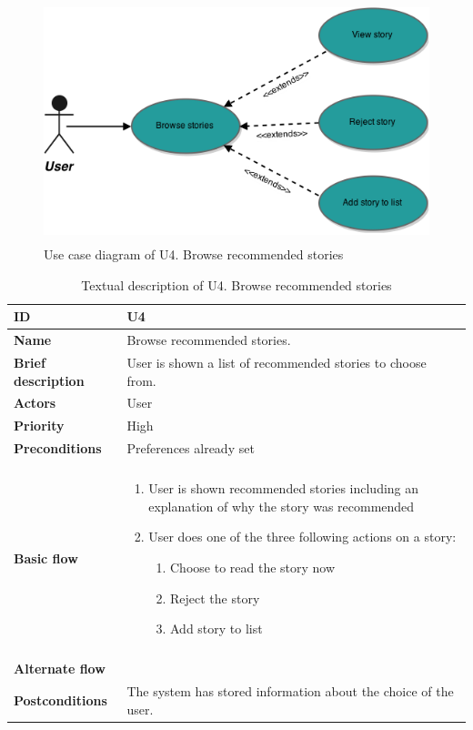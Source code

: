 \begin{figure}[hp]
	\includegraphics[height=7cm]{fig/U4}
	\centering
	\caption{Use case diagram of U4. Browse recommended stories}
	\label{Fig:U4}
\end{figure}

\begin{table}[hp]
	\renewcommand{\arraystretch}{1.5}
	\centering
	\caption{Textual description of U4. Browse recommended stories}
	\begin{tabular}[b]{|l | l|}\hline
		\textbf{ID} 				& U4									\\\hline
		\textbf{Name} 				& Browse recommended stories.			\\\hline
		\textbf{Brief description}	& User is shown a list of recommended stories to choose from. 		\\\hline
		\textbf{Actors} 			& User									\\\hline
		\textbf{Priority}			& High									\\\hline
		\textbf{Preconditions}		& Preferences already set				\\\hline&\\[-2ex]
		\textbf{Basic flow}			& \begin{minipage}{5in}
			\begin{enumerate}[noitemsep]
				\item User is shown recommended stories including an explanation of why the story was recommended
				\item User does one of the three following actions on a story:
					\begin{enumerate}
						\item Choose to read the story now
						\item Reject the story
						\item Add story to list  
					\end{enumerate}
			\end{enumerate}						
		\end{minipage}						\\\hline&\\[-2ex]
		\textbf{Alternate flow}		& \begin{minipage}{5in}
		\end{minipage}							\\\hline
		\textbf{Postconditions}		& The system has stored information about the choice of the user.\\\hline
	\end{tabular}
	\label{Tab:U4}
\end{table}

